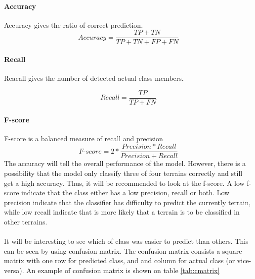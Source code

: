 \documentclass[USenglish]{ifimaster}  %
\begin{document}
	\paragraph{Accuracy}
	Accuracy gives the ratio of correct prediction. 
	\begin{equation}
	Accuracy = \frac{TP + TN}{TP + TN + FP + FN}
	\label{eq:acc}
	\end{equation}
	
	\paragraph{Recall}
	Reacall gives the number of detected actual class members.
	
	\begin{equation}
	Recall = \frac{TP}{TP + FN}
	\label{eq:recall}
	\end{equation}
	
	\paragraph{F-score}
	F-score is a balanced measure of recall and precision 
	\begin{equation}
	\textit{F-score} = 2*\frac{Precision*Recall}{Precision + Recall}
	\label{eq:fscore}
	\end{equation}
	\FloatBarrier
	The accuracy will tell the overall performance of the model. However, there is a possibility that the model only classify three of four terrains correctly and still get a high accuracy. Thus, it will be recommended to look at the f-score. A low f-score indicate that the class either has a low precision, recall or both. Low precision indicate that the classifier has difficulty to predict the currently terrain, while low recall indicate that is more likely that a terrain is to be classified in other terrains.
	\\
	\\
	It will be interesting to see which of class was easier to predict than others. This can be seen by using confusion matrix. The confusion matrix consists a square matrix with one row for predicted class, and and column for actual class (or vice-versa).
	An example of confusion matrix is shown on table \ref{tab:cmatrix}
	
\end{document}
